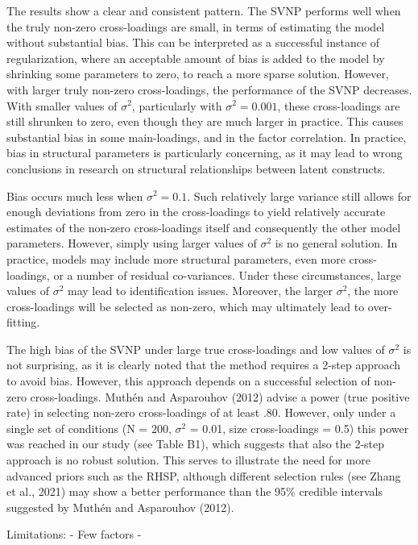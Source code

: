 \documentclass[
  man, donotrepeattitle,floatsintext]{apa6}
\begin{document}
The results show a clear and consistent pattern. The SVNP performs well when the truly non-zero cross-loadings are small, in terms of estimating the model without substantial bias. This can be interpreted as a successful instance of regularization, where an acceptable amount of bias is added to the model by shrinking some parameters to zero, to reach a more sparse solution. However, with larger truly non-zero cross-loadings, the performance of the SVNP decreases. With smaller values of \(\sigma^2\), particularly with \(\sigma^2 = 0.001\), these cross-loadings are still shrunken to zero, even though they are much larger in practice. This causes substantial bias in some main-loadings, and in the factor correlation. In practice, bias in structural parameters is particularly concerning, as it may lead to wrong conclusions in research on structural relationships between latent constructs.

Bias occurs much less when \(\sigma^2 = 0.1\). Such relatively large variance still allows for enough deviations from zero in the cross-loadings to yield relatively accurate estimates of the non-zero cross-loadings itself and consequently the other model parameters. However, simply using larger values of \(\sigma^2\) is no general solution. In practice, models may include more structural parameters, even more cross-loadings, or a number of residual co-variances. Under these circumstances, large values of \(\sigma^2\) may lead to identification issues. Moreover, the larger \(\sigma^2\), the more cross-loadings will be selected as non-zero, which may ultimately lead to over-fitting.

The high bias of the SVNP under large true cross-loadings and low values of \(\sigma^2\) is not surprising, as it is clearly noted that the method requires a 2-step approach to avoid bias. However, this approach depends on a successful selection of non-zero cross-loadings. Muthén and Asparouhov (2012) advise a power (true positive rate) in selecting non-zero cross-loadings of at least .80. However, only under a single set of conditions (N = 200, \(\sigma^2\) = 0.01, size cross-loadings = 0.5) this power was reached in our study (see Table B1), which suggests that also the 2-step approach is no robust solution. This serves to illustrate the need for more advanced priors such as the RHSP, although different selection rules (see Zhang et al., 2021) may show a better performance than the 95\% credible intervals suggested by Muthén and Asparouhov (2012).

Limitations:
- Few factors
-
\end{document}
